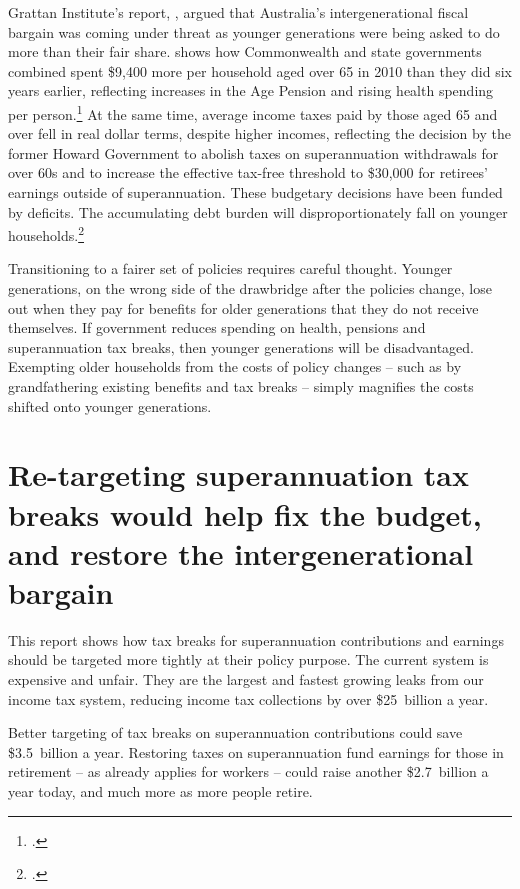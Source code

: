 Grattan Institute’s report, , argued that Australia’s intergenerational fiscal bargain was coming under threat as younger generations were being asked to do more than their fair share.  shows how Commonwealth and state governments combined spent \$9,400 more per household aged over 65 in 2010 than they did six years earlier, reflecting increases in the Age Pension and rising health spending per person.\footcite[][22]{DaleyWoodWeidmannEtAl2014}  At the same time, average income taxes paid by those aged 65 and over fell in real dollar terms, despite higher incomes, reflecting the decision by the former Howard Government to abolish taxes on superannuation withdrawals for over 60s and to increase the effective tax-free threshold to \$30,000 for retirees’ earnings outside of superannuation. These budgetary decisions have been funded by deficits. The accumulating debt burden will disproportionately fall on younger households.\footcite[][29]{DaleyWoodWeidmannEtAl2014}


Transitioning to a fairer set of policies requires careful thought. Younger generations, on the wrong side of the drawbridge after the policies change, lose out when they pay for benefits for older generations that they do not receive themselves. If government reduces spending on health, pensions and superannuation tax breaks, then younger generations will be disadvantaged. Exempting older households from the costs of policy changes – such as by grandfathering existing benefits and tax breaks – simply magnifies the costs shifted onto younger generations. 

\section{Re-targeting superannuation tax breaks would help fix the budget, and restore the intergenerational bargain}
This report shows how tax breaks for superannuation contributions and earnings should be targeted more tightly at their policy purpose. The current system is expensive and unfair. They are the largest and fastest growing leaks from our income tax system, reducing income tax collections by over \$25~billion a year. 

Better targeting of tax breaks on superannuation contributions could save \$3.5~billion a year. Restoring taxes on superannuation fund earnings for those in retirement – as already applies for workers – could raise another \$2.7~billion a year today, and much more as more people retire. 

